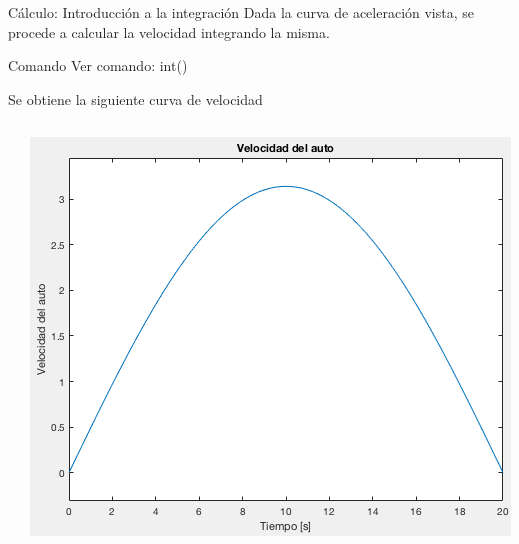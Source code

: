 \documentclass{bredelebeamer}
\begin{document}
\begin{frame}{Cálculo: Introducción a la integración}
Dada la curva de aceleración vista, se procede a calcular la velocidad integrando la misma. 
\begin{exampleblock}{Comando}
Ver comando: int()
\end{exampleblock}
Se obtiene la siguiente curva de velocidad
\begin{columns}
\begin{column}{0.5\textwidth}
\end{column}
\begin{column}{0.5\textwidth}
\begin{center}
\includegraphics[scale=0.3]{images/fig9.png}
\end{center}
\end{column}
\end{columns}
\end{frame}
\end{document}
